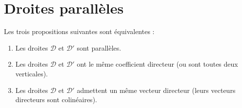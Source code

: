 \documentclass[10pt,a4paper,openany,twoside, prof]{book}
\begin{document}


\vspace{-5mm}
\section{Droites parallèles}

\begin{prop}{}{}
   Les trois propositions suivantes sont équivalentes :

   \begin{enumerate}[label=(\roman*)]
      \item
      Les droites $\mathcal{D}$ et $\mathcal{D'}$ sont parallèles.
      \item
      Les droites $\mathcal{D}$ et $\mathcal{D'}$ ont le même coefficient directeur (ou sont toutes deux verticales).
      \item
      Les droites $\mathcal{D}$ et $\mathcal{D'}$ admettent un même vecteur directeur (leurs vecteurs directeurs sont colinéaires).
   \end{enumerate}
\end{prop}

\newpage





\end{document}
